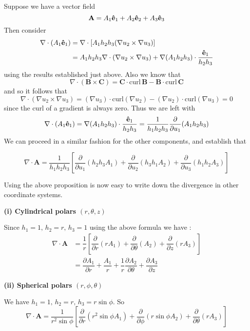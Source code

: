 Suppose we have a vector field
\[
  \mathbf A = A_1 \mathbf{\hat e}_1 + A_2 \mathbf{\hat e}_2 + A_3 \mathbf{\hat e}_3
\]
Then consider 
\begin{align*}
  \nabla \cdot (A_1 \mathbf{\hat e}_1) 
  &= \nabla \cdot [A_1h_2h_3(\nabla u_2 \times \nabla u_3)]\\
  &= A_1h_2h_3 \nabla \cdot (\nabla u_2 \times \nabla u_3) + \nabla(A_1h_2h_3)\cdot \dfrac{\mathbf{\hat e}_1}{h_2h_3}
\end{align*}
using the results established just above. Also we know that 
\[
  \nabla\cdot (\mathbf B \times \mathbf C) = \mathbf C \cdot \mathrm{curl}\,\mathbf B - \mathbf B \cdot \mathrm{curl}\,\mathbf C
\]
and so it follows that 
\[
  \nabla\cdot(\nabla u_2 \times \nabla u_3) = (\nabla u_3)\cdot \mathrm{curl}(\nabla u_2) - (\nabla u_2)\cdot \mathrm{curl}(\nabla u_3) = 0
\]
since the curl of a gradient is always zero. 
Thus we are left with
\[
  \nabla \cdot (A_1\mathbf{\hat e}_1) = \nabla (A_1h_2h_3) \cdot \dfrac{\mathbf{\hat e}_1}{h_2h_3} = \dfrac{1}{h_1h_2h_3}\dfrac{\partial }{\partial u_1} (A_1h_2h_3)
\]
We can proceed in a similar fashion for the other components, and establish that 

\begin{prop}
 
\[
 \nabla \cdot \mathbf A = \dfrac{1}{h_1h_2h_3}\left[\dfrac{\partial }{\partial u_1}(h_2h_3 A_1) + \dfrac{\partial }{\partial u_2}(h_3h_1 A_2) + \dfrac{\partial }{\partial u_3}(h_1h_2A_3)\right]
\]
\end{prop}

Using the above proposition is now  easy to write down  the divergence in other coordinate systems. 


\textbf{(i) Cylindrical polars $(r,\theta,z)$}

Since  $h_1 = 1,\, h_2 = r,\, h_3 = 1$  using the above formula we have :
\begin{align*}
  \nabla \cdot \mathbf A 
  &= \dfrac{1}{r}\left[\dfrac{\partial }{\partial r}(r A_1) + \dfrac{\partial }{\partial \theta}(A_2) + \dfrac{\partial }{\partial z}(r A_3)\right]\\[.2cm]
  &= \dfrac{\partial A_1}{\partial r} + \dfrac{A_1}{r} + \dfrac{1}{r}\dfrac{\partial A_2}{\partial \theta} +\dfrac{\partial A_3}{\partial z}
\end{align*}

\textbf{(ii) Spherical polars $(r,\phi,\theta)$}

We have $h_1 = 1,\, h_2 = r,\, h_3 = r\sin\phi$. So
\[
  \nabla \cdot \mathbf A = \dfrac{1}{r^2\sin\phi} \left[\dfrac{\partial }{\partial r}(r^2 \sin\phi A_1) + \dfrac{\partial }{\partial \phi}(r\sin\phi A_2) + \dfrac{\partial }{\partial \theta}(rA_3)\right]
\]


